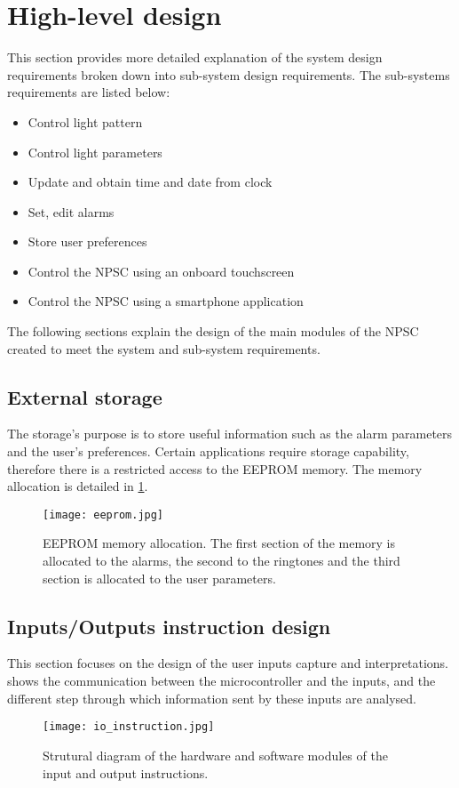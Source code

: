 \section{High-level design}\label{sub_requirements}
This section provides more detailed explanation of the system design requirements broken down into sub-system design requirements. The sub-systems requirements are listed below:
\begin{itemize}
\item Control light pattern
\item Control light parameters
\item Update and obtain time and date from clock
\item Set, edit alarms
\item Store user preferences
\item Control the NPSC using an onboard touchscreen
\item Control the NPSC using a smartphone application
\end{itemize}
The following sections explain the design of the main modules of the NPSC created to meet the system and sub-system requirements.


\subsection{External storage}
The storage's purpose is to store useful information such as the alarm parameters and the user's preferences. Certain applications require storage capability, therefore there is a restricted access to the EEPROM memory. The memory allocation is detailed in \cref{fig:eeprom}.
\begin{figure}[ht]
\centering
\texttt{[image: eeprom.jpg]}
\caption{EEPROM memory allocation. The first section of the memory is allocated to the alarms, the second to the ringtones and the third section is allocated to the user parameters.}
\label{fig:eeprom}
\end{figure}

\subsection{Inputs/Outputs instruction design}
This section focuses on the design of the user inputs capture and interpretations.  shows the communication between the microcontroller and the inputs, and the different step through which information sent by these inputs are analysed. 
\begin{figure}[ht]
\centering
\texttt{[image: io\_instruction.jpg]}
\caption{Strutural diagram of the hardware and software modules of the input and output instructions.}
\label{fig:io_instruction}
\end{figure}

